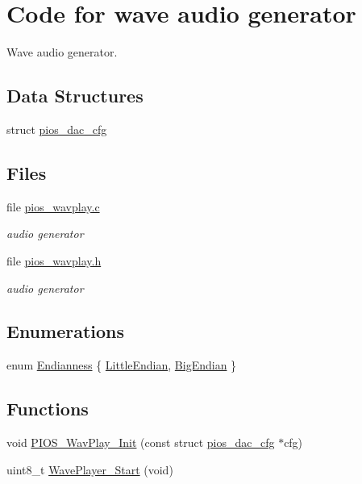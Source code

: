 \hypertarget{group___p_i_o_s___w_a_v_p_l_a_y}{\section{\-Code for wave audio generator}
\label{group___p_i_o_s___w_a_v_p_l_a_y}
}


\-Wave audio generator.  


\subsection*{\-Data \-Structures}
\begin{DoxyCompactItemize}
\item 
struct \hyperlink{structpios__dac__cfg}{pios\-\_\-dac\-\_\-cfg}
\end{DoxyCompactItemize}
\subsection*{\-Files}
\begin{DoxyCompactItemize}
\item 
file \hyperlink{pios__wavplay_8c}{pios\-\_\-wavplay.\-c}
\begin{DoxyCompactList}\small\item\em audio generator \end{DoxyCompactList}\item 
file \hyperlink{pios__wavplay_8h}{pios\-\_\-wavplay.\-h}
\begin{DoxyCompactList}\small\item\em audio generator \end{DoxyCompactList}\end{DoxyCompactItemize}
\subsection*{\-Enumerations}
\begin{DoxyCompactItemize}
\item 
enum \hyperlink{group___p_i_o_s___w_a_v_p_l_a_y_ga4f3ee12da30a1e47c52dc137b4627cab}{\-Endianness} \{ \hyperlink{group___p_i_o_s___w_a_v_p_l_a_y_gga4f3ee12da30a1e47c52dc137b4627caba66c163903fb08aef1735714dbb818cc7}{\-Little\-Endian}, 
\hyperlink{group___p_i_o_s___w_a_v_p_l_a_y_gga4f3ee12da30a1e47c52dc137b4627cabab90b00401d08d0ecc6b6c2c54db50d6b}{\-Big\-Endian}
 \}
\end{DoxyCompactItemize}
\subsection*{\-Functions}
\begin{DoxyCompactItemize}
\item 
void \hyperlink{group___p_i_o_s___w_a_v_p_l_a_y_ga833570d033bad7d2098b024caec552be}{\-P\-I\-O\-S\-\_\-\-Wav\-Play\-\_\-\-Init} (const struct \hyperlink{structpios__dac__cfg}{pios\-\_\-dac\-\_\-cfg} $\ast$cfg)
\item 
uint8\-\_\-t \hyperlink{group___p_i_o_s___w_a_v_p_l_a_y_gad653a67ad3415d1d9d9c91e13904fb06}{\-Wave\-Player\-\_\-\-Start} (void)
\end{DoxyCompactItemize}
